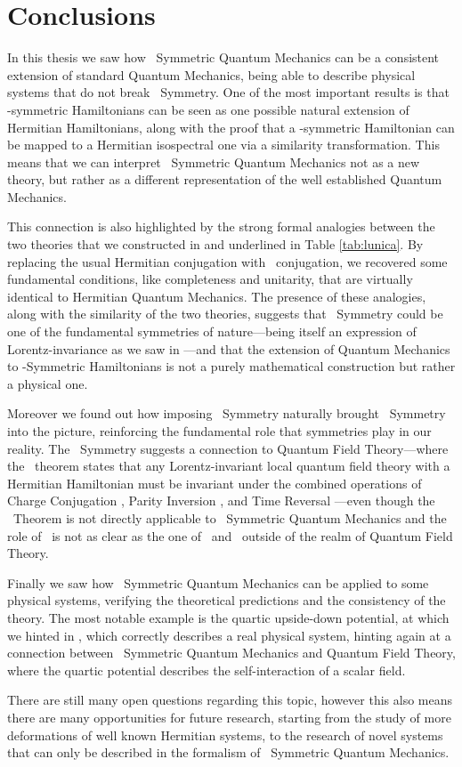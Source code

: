 \chapter{Conclusions}\label{ch:conclusions}
    In this thesis we saw how \PT\ Symmetric Quantum Mechanics can be a consistent extension of standard Quantum Mechanics, being able to describe physical systems that do not break \PT\ Symmetry. One of the most important results is that \PT-symmetric Hamiltonians can be seen as one possible natural extension of Hermitian Hamiltonians, along with the proof that a \PT-symmetric Hamiltonian can be mapped to a Hermitian isospectral one via a similarity transformation. This means that we can interpret \PT\ Symmetric Quantum Mechanics not as a new theory, but rather as a different representation of the well established Quantum Mechanics.
    
    This connection is also highlighted by the strong formal analogies between the two theories that we constructed in  and underlined in Table \ref{tab:lunica}. By replacing the usual Hermitian conjugation with \CPT\ conjugation, we recovered some fundamental conditions, like completeness and unitarity, that are virtually identical to Hermitian Quantum Mechanics. The presence of these analogies, along with the similarity of the two theories, suggests that \PT\ Symmetry could be one of the fundamental symmetries of nature---being itself an expression of Lorentz-invariance as we saw in ---and that the extension of Quantum Mechanics to \PT-Symmetric Hamiltonians is not a purely mathematical construction but rather a physical one.

    Moreover we found out how imposing \PT\ Symmetry naturally brought \CPT\ Symmetry into the picture, reinforcing the fundamental role that symmetries play in our reality. The \CPT\ Symmetry suggests a connection to Quantum Field Theory---where the \CPT\ theorem states that any Lorentz-invariant local quantum field theory with a Hermitian Hamiltonian must be invariant under the combined operations of Charge Conjugation \hC, Parity Inversion \hP, and Time Reversal \hT---even though the \CPT\ Theorem is not directly applicable to \PT\ Symmetric Quantum Mechanics and the role of \hC\ is not as clear as the one of \hP\ and \hT\ outside of the realm of Quantum Field Theory.

    Finally we saw how \PT\ Symmetric Quantum Mechanics can be applied to some physical systems, verifying the theoretical predictions and the consistency of the theory. The most notable example is the quartic upside-down potential, at which we hinted in , which correctly describes a real physical system, hinting again at a connection between \PT\ Symmetric Quantum Mechanics and Quantum Field Theory, where the quartic potential describes the self-interaction of a scalar field.

    There are still many open questions regarding this topic, however this also means there are many opportunities for future research, starting from the study of more deformations of well known Hermitian systems, to the research of novel systems that can only be described in the formalism of \PT\ Symmetric Quantum Mechanics.